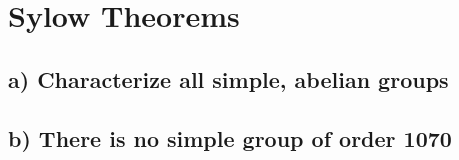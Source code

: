 \section{Sylow Theorems}

\subsection*{a) Characterize all simple, abelian groups}


\subsection*{b) There is no simple group of order 1070}


